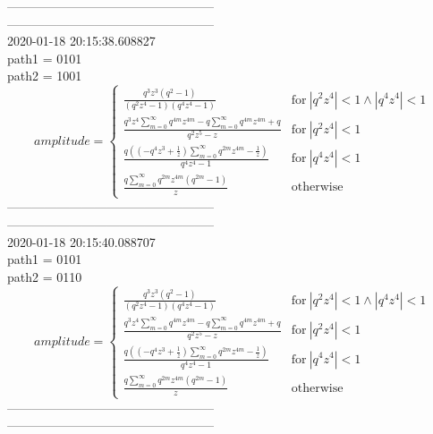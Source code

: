 --------------------------------------------------\\
--------------------------------------------------\\
2020-01-18 20:15:38.608827\\
path1 = 0101\\
path2 = 1001\\
$$amplitude = \begin{cases} \frac{q^{3} z^{3} \left(q^{2} - 1\right)}{\left(q^{2} z^{4} - 1\right) \left(q^{4} z^{4} - 1\right)} & \text{for}\: \left|{q^{2} z^{4}}\right| < 1 \wedge \left|{q^{4} z^{4}}\right| < 1 \\\frac{q^{3} z^{4} \sum_{m=0}^{\infty} q^{4 m} z^{4 m} - q \sum_{m=0}^{\infty} q^{4 m} z^{4 m} + q}{q^{2} z^{5} - z} & \text{for}\: \left|{q^{2} z^{4}}\right| < 1 \\\frac{q \left(\left(- q^{4} z^{3} + \frac{1}{z}\right) \sum_{m=0}^{\infty} q^{2 m} z^{4 m} - \frac{1}{z}\right)}{q^{4} z^{4} - 1} & \text{for}\: \left|{q^{4} z^{4}}\right| < 1 \\\frac{q \sum_{m=0}^{\infty} q^{2 m} z^{4 m} \left(q^{2 m} - 1\right)}{z} & \text{otherwise} \end{cases}$$
--------------------------------------------------\\
--------------------------------------------------\\
2020-01-18 20:15:40.088707\\
path1 = 0101\\
path2 = 0110\\
$$amplitude = \begin{cases} \frac{q^{3} z^{3} \left(q^{2} - 1\right)}{\left(q^{2} z^{4} - 1\right) \left(q^{4} z^{4} - 1\right)} & \text{for}\: \left|{q^{2} z^{4}}\right| < 1 \wedge \left|{q^{4} z^{4}}\right| < 1 \\\frac{q^{3} z^{4} \sum_{m=0}^{\infty} q^{4 m} z^{4 m} - q \sum_{m=0}^{\infty} q^{4 m} z^{4 m} + q}{q^{2} z^{5} - z} & \text{for}\: \left|{q^{2} z^{4}}\right| < 1 \\\frac{q \left(\left(- q^{4} z^{3} + \frac{1}{z}\right) \sum_{m=0}^{\infty} q^{2 m} z^{4 m} - \frac{1}{z}\right)}{q^{4} z^{4} - 1} & \text{for}\: \left|{q^{4} z^{4}}\right| < 1 \\\frac{q \sum_{m=0}^{\infty} q^{2 m} z^{4 m} \left(q^{2 m} - 1\right)}{z} & \text{otherwise} \end{cases}$$
--------------------------------------------------\\
--------------------------------------------------\\
